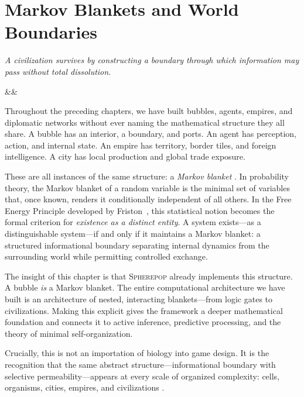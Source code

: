 \documentclass[11pt,a4paper,openany]{book}
\theoremstyle{plain}
\theoremstyle{definition}
\theoremstyle{remark}
\newenvironment{background}{%
  \begin{mdframed}[
    linecolor=sphereblue!40, backgroundcolor=sphereblue!5,
    linewidth=1pt, innertopmargin=8pt, innerbottommargin=8pt,
    innerleftmargin=10pt, innerrightmargin=10pt,
    skipabove=10pt, skipbelow=6pt
  ]%
  \setlength{\parindent}{0pt}%
  \noindent{\textcolor{sphereblue}{\textbf{Background}}}\par\smallskip\ignorespaces
}{\end{mdframed}}
\newcommand{\Spbox}{\textsc{Spherepop}\xspace}
\newcommand{\Spbox}{\textbf{Spherepop}\xspace}
\newcommand{\chapterquote}[2]{%
  \par\vspace{0.8em}%
  \begin{flushright}%
    \begin{minipage}{0.65\textwidth}%
      {\itshape #1\par}%
      \ifx&#2&\else\vspace{0.3em}{\raggedleft\small--- #2\par}\fi%
    \end{minipage}%
  \end{flushright}%
  \vspace{0.8em}\par\noindent}
\begin{document}
\chapter{Markov Blankets and World Boundaries}
\label{ch:blankets}

\chapterquote{%
  A civilization survives by constructing a boundary through which
  information may pass without total dissolution.
}{}

\begin{background}
  Throughout the preceding chapters, we have built bubbles, agents, empires,
  and diplomatic networks without ever naming the mathematical structure they
  all share. A bubble has an interior, a boundary, and ports. An agent
  has perception, action, and internal state. An empire has territory,
  border tiles, and foreign intelligence. A city has local production and
  global trade exposure.

  These are all instances of the same structure: a \emph{Markov blanket}
  \cite{Friston}. In probability theory, the Markov blanket of a random
  variable is the minimal set of variables that, once known, renders it
  conditionally independent of all others. In the Free Energy Principle
  developed by Friston~\cite{FristonBlanket}, this statistical notion
  becomes the formal criterion for \emph{existence as a distinct entity}.
  A system exists---as a distinguishable system---if and only if it
  maintains a Markov blanket: a structured informational boundary separating
  internal dynamics from the surrounding world while permitting controlled
  exchange.

  The insight of this chapter is that \Spbox  already implements this
  structure. A bubble \emph{is} a Markov blanket. The entire computational
  architecture we have built is an architecture of nested, interacting
  blankets---from logic gates to civilizations. Making this explicit
  gives the framework a deeper mathematical foundation and connects it to
  active inference, predictive processing, and the theory of minimal
  self-organization.

  Crucially, this is not an importation of biology into game design.
  It is the recognition that the same abstract structure---informational
  boundary with selective permeability---appears at every scale of
  organized complexity: cells, organisms, cities, empires, and
  civilizations \cite{Levin}.
\end{background}
\end{document}
